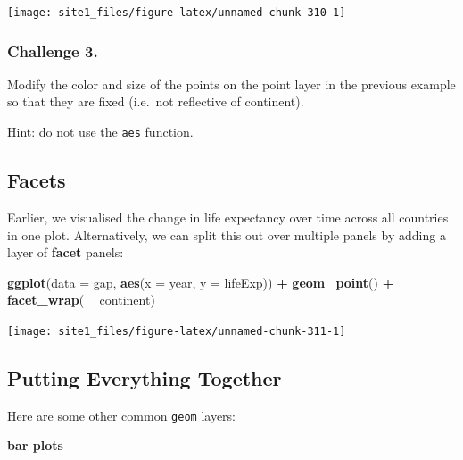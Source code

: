 \documentclass[]{book}
\newenvironment{Shaded}{\begin{snugshade}}{\end{snugshade}}
\newcommand{\KeywordTok}[1]{\textcolor[rgb]{0.13,0.29,0.53}{\textbf{#1}}}
\newcommand{\DataTypeTok}[1]{\textcolor[rgb]{0.13,0.29,0.53}{#1}}
\newcommand{\StringTok}[1]{\textcolor[rgb]{0.31,0.60,0.02}{#1}}
\newcommand{\OperatorTok}[1]{\textcolor[rgb]{0.81,0.36,0.00}{\textbf{#1}}}
\newcommand{\NormalTok}[1]{#1}
\begin{document}
\begin{center}\texttt{[image: site1\_files/figure-latex/unnamed-chunk-310-1]} \end{center}

\subsubsection*{Challenge 3.}\label{challenge-3.-5}

Modify the color and size of the points on the point layer in the
previous example so that they are fixed (i.e.~not reflective of
continent).

Hint: do not use the \texttt{aes} function.

\subsection{Facets}\label{facets}

Earlier, we visualised the change in life expectancy over time across
all countries in one plot. Alternatively, we can split this out over
multiple panels by adding a layer of \textbf{facet} panels:

\begin{Shaded}
\begin{Highlighting}[]
\KeywordTok{ggplot}\NormalTok{(}\DataTypeTok{data =}\NormalTok{ gap, }\KeywordTok{aes}\NormalTok{(}\DataTypeTok{x =}\NormalTok{ year, }\DataTypeTok{y =}\NormalTok{ lifeExp)) }\OperatorTok{+}
\StringTok{  }\KeywordTok{geom_point}\NormalTok{() }\OperatorTok{+}\StringTok{ }
\StringTok{  }\KeywordTok{facet_wrap}\NormalTok{( }\OperatorTok{~}\StringTok{ }\NormalTok{continent)}
\end{Highlighting}
\end{Shaded}

\begin{center}\texttt{[image: site1\_files/figure-latex/unnamed-chunk-311-1]} \end{center}

\subsection{Putting Everything
Together}\label{putting-everything-together}

Here are some other common \texttt{geom} layers:

\textbf{bar plots}
\end{document}
